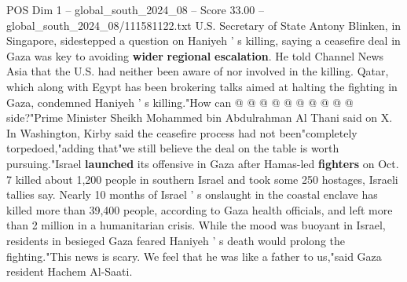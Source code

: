 \begin{textsample}{POS Dim 1 – global\_south\_2024\_08 – Score 33.00 – global\_south\_2024\_08/111581122.txt}
U.S.
Secretary of State Antony Blinken, in Singapore, sidestepped a question on Haniyeh ' s killing, saying a ceasefire deal in Gaza was key to avoiding \textbf{wider} \textbf{regional} \textbf{escalation}.
He told Channel News Asia that the U.S. had neither been aware of nor involved in the killing.
Qatar, which along with Egypt has been brokering talks aimed at halting the fighting in Gaza, condemned Haniyeh ' s killing."How can @ @ @ @ @ @ @ @ @ @ side?"Prime Minister Sheikh Mohammed bin Abdulrahman Al Thani said on X.
In Washington, Kirby said the ceasefire process had not been"completely torpedoed,"adding that"we still believe the deal on the table is worth pursuing."Israel \textbf{launched} its offensive in Gaza after Hamas-led \textbf{fighters} on Oct. 7 killed about 1,200 people in southern Israel and took some 250 hostages, Israeli tallies say.
Nearly 10 months of Israel ' s onslaught in the coastal enclave has killed more than 39,400 people, according to Gaza health officials, and left more than 2 million in a humanitarian crisis.
While the mood was buoyant in Israel, residents in besieged Gaza feared Haniyeh ' s death would prolong the fighting."This news is scary.
We feel that he was like a father to us,"said Gaza resident Hachem Al-Saati.

\end{textsample}
